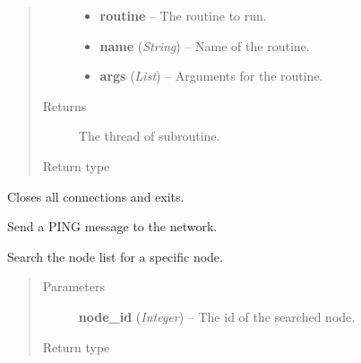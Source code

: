 \documentclass[letterpaper,10pt,english]{sphinxmanual}
\begin{document}
\begin{fulllineitems}
\begin{fulllineitems}
\begin{quote}
\begin{description}
\begin{itemize}
\item {} 
\textbf{routine} -- The routine to run.

\item {} 
\textbf{name} (\emph{String}) -- Name of the routine.

\item {} 
\textbf{args} (\emph{List}) -- Arguments for the routine.

\end{itemize}

\item[{Returns}] \leavevmode
The thread of subroutine.

\item[{Return type}] \leavevmode
{}

\end{description}\end{quote}

\end{fulllineitems}


\begin{fulllineitems}
\label{swnp:swnp.SWNP.close}
Closes all connections and exits.

\end{fulllineitems}


\begin{fulllineitems}
\label{swnp:swnp.SWNP.do_ping}
Send a PING message to the network.

\end{fulllineitems}


\begin{fulllineitems}
\label{swnp:swnp.SWNP.find_node}
Search the node list for a specific node.
\begin{quote}\begin{description}
\item[{Parameters}] \leavevmode
\textbf{node\_id} (\emph{Integer}) -- The id of the searched node.

\item[{Return type}] \leavevmode
{\hyperref[swnp:swnp.Node]{}}


\end{description}
\end{quote}
\end{fulllineitems}
\end{fulllineitems}
\end{document}

